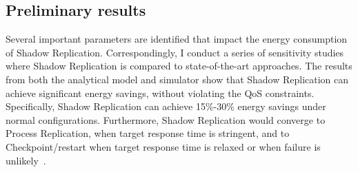 \subsection{Preliminary results}
Several important parameters are identified that impact the energy consumption of Shadow Replication. Correspondingly, I conduct a series of sensitivity studies where Shadow Replication is compared to state-of-the-art approaches. %
The results from both the analytical model and simulator show that Shadow Replication can achieve significant energy savings, without violating the QoS constraints. %
Specifically, Shadow Replication can achieve 15\%-30\% energy savings under normal configurations. Furthermore, Shadow Replication would converge to Process Replication, when target response time is stringent, and to Checkpoint/restart when target response time is relaxed or when failure is unlikely~\cite{cui_closer_2014}.



